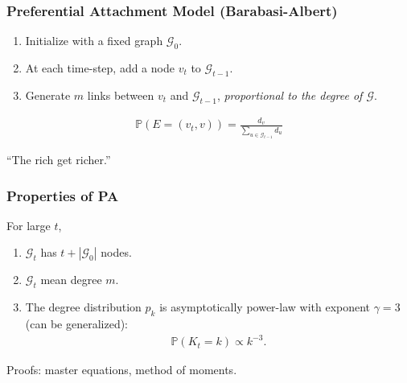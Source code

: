 \documentclass{beamer}
\newcommand\abs[1]{\left|#1\right|}
\newcommand\prob[0]{\mathbb{P}}
\begin{document}
	
		
		\begin{frame}\frametitle{Preferential Attachment Model (Barabasi-Albert)}
		  	\begin{enumerate}
		  		\item Initialize with a fixed graph $\mathcal{G}_0$. 
		  		\item At each time-step, add a node $v_t$ to $\mathcal{G}_{t-1}$. 
		  		\item Generate $m$ links between $v_t$ and $\mathcal{G}_{t-1}$, \emph{proportional to the degree of $\mathcal{G}$}. 
		  	\end{enumerate}
		  	\begin{align*}
		  		\prob(E = (v_t, v)) = \frac{d_v}{\sum_{u \in \mathcal{G}_{t-1}}d_u} 
		  	\end{align*}

		  	``The rich get richer.''
		\end{frame}
	
		
		\begin{frame}\frametitle{Properties of PA}
			For large $t$, 
			\begin{enumerate}
				\pause \item $\mathcal{G}_t$ has $t + \abs{\mathcal{G}_0}$ nodes. 
				\pause \item $\mathcal{G}_t$ mean degree $m$. 
				\pause \item The degree distribution $p_k$ is asymptotically power-law with exponent $\gamma = 3$ (can be generalized):
				\pause \begin{align}
				 	\prob(K_t = k) \propto k^{-3} \tag{asymptotic}.
				 \end{align} 
			\end{enumerate}
			\pause Proofs: master equations, method of moments.
		\end{frame}
	
\end{document}
